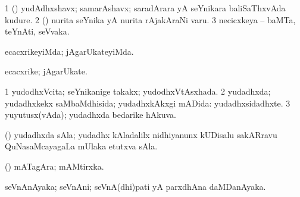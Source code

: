 \bentry
{} 
\gl{\nA}
\expl{}
\bmng
\bnum
\num{1} (\ca) yudAdhxshavx; samarAshavx; saradArara yA seYnikara baliSaThxvAda kudure. 
\num{2} (\AmA) nurita seYnika yA nurita rAjakAraNi \mo varu. 
\num{3} necicxkeya -- baMTa, teYnAti, seVvaka. 
\enum
\emng
\eentry

\bentry
{} 
\gl{\kirxvi}
\expl{}
\bmng
ecacxrikeyiMda; jAgarUkateyiMda. 
\emng
\eentry

\bentry
{} 
\gl{\nA}
\expl{}
\bmng
ecacxrike; jAgarUkate. 
\emng
\eentry

\bentry
{} 
\gl{\gu}
\expl{}
\bmng
\bnum
\num{1} yudodhxVcita; seYnikanige takakx; yudodhxVtAsxhada. 
\num{2} yudadhxda; yudadhxkekx saMbaMdhisida; yudadhxkAkxgi mADida:  yudadhxsidadhxte. 
\num{3} yuyutusx(vAda); yudadhxda bedarike hAkuva. 
\enum
\emng
\eentry

\bentry
{} 
\gl{\nA}
\expl{}
\bmng
(\birx) yudadhxda sAla; yudadhx kAladalilx nidhiyanunx kUDisalu sakARravu QuNasaMcayagaLa mUlaka etutxva sAla. 
\emng
\eentry

\bentry
{} 
\gl{\nA}
\expl{}
\bmng
(\pArxparx) mATagAra; mAMtirxka. 
\emng
\eentry

\bentry
{} 
\gl{\nA}
\expl{}
\bmng
seVnAnAyaka; seVnAni; seVnA(dhi)pati yA parxdhAna daMDanAyaka. 
\emng
\eentry

